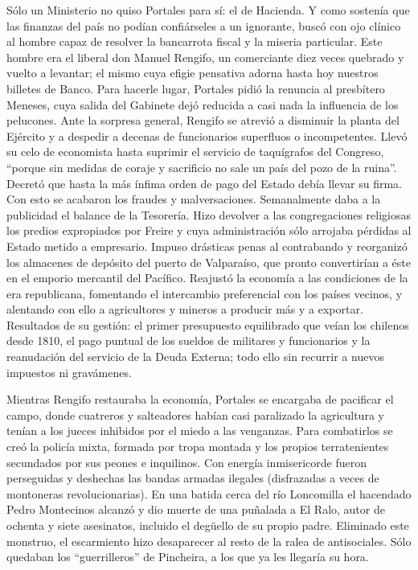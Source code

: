\documentclass[10pt,twoside,openright]{memoir}
\begin{document}
Sólo un Ministerio no quiso Portales
para sí: el de Hacienda. Y como sostenía que las finanzas del país no
podían confiárseles a un ignorante, buscó con ojo clínico al hombre
capaz de resolver la bancarrota fiscal y la miseria particular. Este
hombre era el liberal don Manuel Rengifo, un comerciante diez veces
quebrado y vuelto a levantar; el mismo cuya efigie pensativa adorna
hasta hoy nuestros billetes de Banco.
Para
hacerle lugar, Portales pidió la renuncia al presbítero Meneses, cuya
salida del Gabinete dejó reducida a
casi nada la influencia de los pelucones. Ante la sorpresa general,
Rengifo se atrevió a disminuir la planta del Ejército y a despedir a
decenas de funcionarios superfluos o incompetentes. Llevó su celo de
economista hasta suprimir el servicio de taquígrafos del Congreso,
``porque sin medidas de coraje y sacrificio no sale un país del pozo de
la ruina''. Decretó que hasta la más ínfima orden de pago del Estado
debía llevar su firma. Con esto se acabaron los fraudes y
malversaciones. Semanalmente daba a la publicidad el balance de la
Tesorería. Hizo devolver a las congregaciones religiosas los predios
expropiados por Freire y cuya administración sólo arrojaba pérdidas al
Estado metido a empresario. Impuso drásticas penas al contrabando y
reorganizó los almacenes de depósito del puerto de Valparaíso, que
pronto convertirían a éste en el emporio mercantil del Pacífico.
Reajustó la economía a las condiciones de la era republicana, fomentando
el intercambio preferencial con los países vecinos, y alentando con ello
a agricultores y mineros a producir más y a exportar. Resultados de su
gestión: el primer presupuesto equilibrado que veían los chilenos desde
1810, el pago puntual de los sueldos de militares y funcionarios y la
reanudación del servicio de la Deuda Externa; todo ello sin recurrir a
nuevos impuestos ni gravámenes.

Mientras Rengifo restauraba la economía, Portales
 se encargaba de pacificar el campo,
donde cuatreros y salteadores habían casi paralizado la agricultura y
tenían a los jueces inhibidos por el miedo a las venganzas. Para
combatirlos se creó la policía mixta, formada por tropa montada y los
propios terratenientes secundados por sus peones e inquilinos. Con
energía inmisericorde fueron perseguidas y deshechas las bandas armadas
ilegales (disfrazadas a veces de
montoneras revolucionarias). En una
batida cerca del río Loncomilla el hacendado Pedro Montecinos alcanzó y
dio muerte de una puñalada a El Ralo, autor de ochenta y siete
asesinatos, incluido el degüello de su
propio padre. Eliminado este
monstruo, el escarmiento hizo desaparecer al resto de la ralea de
antisociales. Sólo quedaban los ``guerrilleros'' de Pincheira, a los que
ya les llegaría su hora. 
\end{document}
